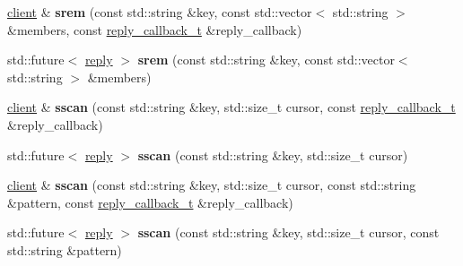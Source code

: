 \begin{DoxyCompactItemize}
\item 
\mbox{\label{classcpp__redis_1_1client_a020849a43f10f56941ef98716440d817}} 
\mbox{\hyperlink{classcpp__redis_1_1client}{client}} \& {\bfseries srem} (const std\+::string \&key, const std\+::vector$<$ std\+::string $>$ \&members, const \mbox{\hyperlink{classcpp__redis_1_1client_af7a65eb21aa25230bfbb0b0203c4fc04}{reply\+\_\+callback\+\_\+t}} \&reply\+\_\+callback)
\item 
\mbox{\label{classcpp__redis_1_1client_a542bc98a1968e22dfce3cd7051680b6f}} 
std\+::future$<$ \mbox{\hyperlink{classcpp__redis_1_1reply}{reply}} $>$ {\bfseries srem} (const std\+::string \&key, const std\+::vector$<$ std\+::string $>$ \&members)
\item 
\mbox{\label{classcpp__redis_1_1client_a96d9cbf57d4bb56f41d4681c657db256}} 
\mbox{\hyperlink{classcpp__redis_1_1client}{client}} \& {\bfseries sscan} (const std\+::string \&key, std\+::size\+\_\+t cursor, const \mbox{\hyperlink{classcpp__redis_1_1client_af7a65eb21aa25230bfbb0b0203c4fc04}{reply\+\_\+callback\+\_\+t}} \&reply\+\_\+callback)
\item 
\mbox{\label{classcpp__redis_1_1client_af5828f278552142ccd9dfc700ac19a4c}} 
std\+::future$<$ \mbox{\hyperlink{classcpp__redis_1_1reply}{reply}} $>$ {\bfseries sscan} (const std\+::string \&key, std\+::size\+\_\+t cursor)
\item 
\mbox{\label{classcpp__redis_1_1client_a020b2980d1045441aee35fb207e5ef3c}} 
\mbox{\hyperlink{classcpp__redis_1_1client}{client}} \& {\bfseries sscan} (const std\+::string \&key, std\+::size\+\_\+t cursor, const std\+::string \&pattern, const \mbox{\hyperlink{classcpp__redis_1_1client_af7a65eb21aa25230bfbb0b0203c4fc04}{reply\+\_\+callback\+\_\+t}} \&reply\+\_\+callback)
\item 
\mbox{\label{classcpp__redis_1_1client_a3ebaa0831cd98cf76ff857e372672927}} 
std\+::future$<$ \mbox{\hyperlink{classcpp__redis_1_1reply}{reply}} $>$ {\bfseries sscan} (const std\+::string \&key, std\+::size\+\_\+t cursor, const std\+::string \&pattern)
\item 
\mbox{\label{classcpp__redis_1_1client_a9bffecb9c655eb2820bde4f3ea1eaa34}} 

\end{DoxyCompactItemize}
